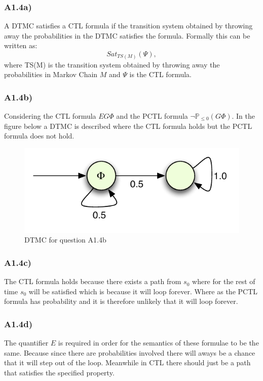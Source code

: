 \documentclass[12pt]{report}
\begin{document}
\subsubsection*{A1.4a)}
A DTMC satisfies a CTL formula if the transition system obtained by throwing away the probabilities in the DTMC satisfies the formula. Formally this can be written as:
$$Sat_{TS(M)}(\Psi),$$
where TS(M) is the transition system obtained by throwing away the probabilities in Markov Chain $M$ and $\Psi$ is the CTL formula.

\subsubsection*{A1.4b)}
Considering the CTL formula $EG \Phi$ and the PCTL formula $\neg \mathbb{P}_{\leq 0}(G \Phi)$. In the figure below a DTMC is described where the CTL formula holds but the PCTL formula does not hold.
\begin{figure}[H]
	\begin{center}
		\includegraphics[scale=.85]{../GFX/Answer-A1-4b.pdf}
	\end{center}
	\caption{DTMC for question A1.4b}
	\label{fig:1a14b}
\end{figure}

\subsubsection*{A1.4c)}
The CTL formula holds because there exists a path from $s_0$ where for the rest of time $s_0$ will be satisfied which is because it will loop forever. Where as the PCTL formula has probability and it is therefore unlikely that it will loop forever.

\subsubsection*{A1.4d)}
The quantifier $E$ is required in order for the semantics of these formulae to be the same. Because since there are probabilities involved there will aways be a chance that it will step out of the loop. Meanwhile in CTL there should just be a path that satisfies the specified property.
\end{document}
